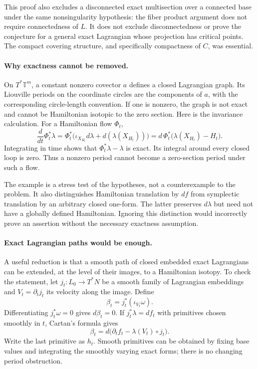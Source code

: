 \documentclass[11pt]{article}
\begin{document}
This proof also excludes a disconnected exact multisection over a
connected base under the same nonsingularity hypothesis: the fiber
product argument does not require connectedness of $L$. It does not
exclude disconnectedness or prove the conjecture for a general exact
Lagrangian whose projection has critical points. The compact covering
structure, and specifically compactness of $C$, was essential.

\paragraph{Why exactness cannot be removed.}
On $T^*\mathbb T^m$, a constant nonzero covector $a$ defines a closed
Lagrangian graph. Its Liouville periods on the coordinate circles are
the components of $a$, with the corresponding circle-length convention.
If one is nonzero, the graph is not exact and cannot be Hamiltonian
isotopic to the zero section. Here is the invariance calculation.
For a Hamiltonian flow $\Phi_t$,
\[
 \frac{d}{dt}\Phi_t^*\lambda
 =\Phi_t^*\bigl(\iota_{X_{H_t}}d\lambda+
                           d(\lambda(X_{H_t}))\bigr)
 =d\,\Phi_t^*\bigl(\lambda(X_{H_t})-H_t\bigr).
\]
Integrating in time shows that $\Phi_t^*\lambda-\lambda$ is exact.
Its integral around every closed loop is zero. Thus a nonzero period
cannot become a zero-section period under such a flow.

The example is a stress test of the hypotheses, not a counterexample
to the problem. It also distinguishes Hamiltonian translation by $df$
from symplectic translation by an arbitrary closed one-form. The latter
preserves $d\lambda$ but need not have a globally defined Hamiltonian.
Ignoring this distinction would incorrectly prove an assertion without
the necessary exactness assumption.

\paragraph{Exact Lagrangian paths would be enough.}
A useful reduction is that a smooth path of closed embedded exact
Lagrangians can be extended, at the level of their images, to a
Hamiltonian isotopy. To check the statement, let
$j_t:L_0\to T^*N$ be a smooth family of Lagrangian embeddings and
$V_t=\partial_tj_t$ its velocity along the image. Define
\[
 \beta_t=j_t^*(\iota_{V_t}\omega).
\]
Differentiating $j_t^*\omega=0$ gives $d\beta_t=0$. If
$j_t^*\lambda=df_t$ with primitives chosen smoothly in $t$, Cartan's
formula gives
\[
 \beta_t=d\bigl(\partial_tf_t-\lambda(V_t)\circ j_t\bigr).
\]
Write the last primitive as $h_t$. Smooth primitives can be obtained
by fixing base values and integrating the smoothly varying exact forms;
there is no changing period obstruction.
\end{document}
